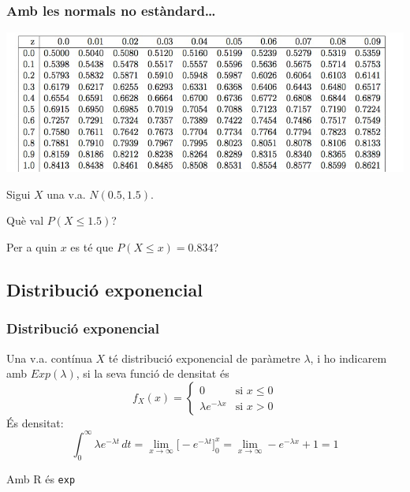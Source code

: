 \documentclass[12pt,t]{beamer}\usepackage[]{graphicx}\usepackage[]{color}
\renewcommand{\emph}[1]{{\color{red}#1}}
\renewcommand{\leq}{\leqslant}
\theoremstyle{plain}
\theoremstyle{definition}
\begin{document}
\begin{frame}
\frametitle{Amb les normals no estàndard\ldots}
\vspace*{-1cm}

\begin{center}
\hspace*{-0.4cm}\includegraphics[width=1.1\linewidth]{tabla.jpg}
\end{center}

Sigui $X$ una v.a. $N(0.5,1.5)$. \medskip

Què val $P(X\leq 1.5)$? \medskip

Per a quin $x$ es té que $P(X\leq x)=0.834$?



\end{frame}




\subsection{Distribució exponencial}

\begin{frame}[fragile]
\frametitle{Distribució exponencial}
Una v.a. contínua $X$ té \emph{distribució exponencial} de paràmetre $\lambda$, i ho indicarem amb \emph{$Exp(\lambda)$}, si la seva funció de densitat és
 $$
 f_X(x)=
 \left\{\begin{array}{ll}
0 & \mbox{si } x\leq 0\\[2ex] \lambda e^{-\lambda x}  & \mbox{si $x>0$}
\end{array}
\right. $$ 
És densitat:
$$
\int_0^\infty  \lambda e^{-\lambda t}\,dt=\lim_{x\to\infty}\Big[-e^{-\lambda t}\Big]_0^x=\lim_{x\to\infty}-e^{-\lambda x}+1=1
$$

Amb R és \texttt{exp}


\end{frame}
\end{document}

